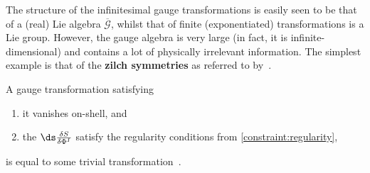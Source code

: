     The structure of the infinitesimal gauge transformations is easily seen to be that of a (real) Lie algebra $\overline{\mathcal{G}}$, whilst that of finite (exponentiated) transformations is a Lie group. However, the gauge algebra is very large (in fact, it is infinite-dimensional) and contains a lot of physically irrelevant information. The simplest example is that of the \textbf{zilch symmetries} as referred to by~\citet{van_proeyen_supergravity_2012}.
    \begin{property}
        A gauge transformation satisfying
        \begin{enumerate}
            \item it vanishes on-shell, and
            \item the $\ds\frac{\delta S}{\delta\Phi^I}$ satisfy the regularity conditions from \cref{constraint:regularity},
        \end{enumerate}
        is equal to some trivial transformation~\citep[p.~70]{henneaux_quantization_1992}.
    \end{property}

